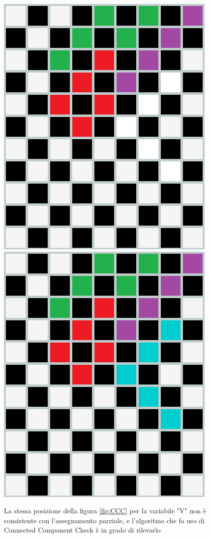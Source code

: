 \begin{figure}[h]
	\centering
	{\includegraphics[scale=0.35]{immagini/esCC}}
	\hspace{5mm}
	{\includegraphics[scale=0.35]{immagini/esCC_no}}
	\caption{La stessa posizione della figura \ref{fig:CCC} per la variabile "V" non è consistente con l'assegnamento parziale, e l'algoritmo che fa uso di Connected Component Check è in grado di rilevarlo}
	\label{fig:badCCC}
\end{figure}
 